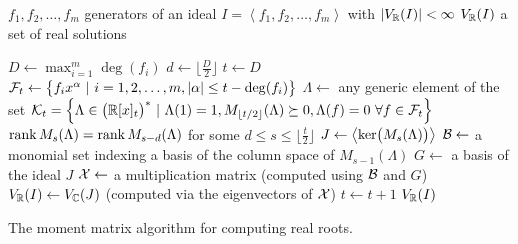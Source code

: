 \begin{algorithm}[ht]
  \begin{algorithmic}[1]
    \Require
      \Statex $f_1, f_2, \ldots, f_m$ generators of an ideal $I = \left<f_1, f_2, \ldots, f_m\right>$ with $|V_{\mathbb{R}}(I)|<\infty$
    \Ensure
      \Statex $V_{\mathbb{R}}(I)$ a set of real solutions
      \Statex

    \State $D \gets \max_{i=1}^m\deg(f_i)$
    \State $d \gets \big\lfloor \frac{D}{2} \big\rfloor$
    \State $t \gets D$
    \While{\True}
    \State $\mathcal{F}_t \gets \big\{f_ix^\alpha\ |\ i = 1, 2, \ldots, m, |\alpha|\leq t-\deg(f_i)\big\}$
    \State $\Lambda \gets$ any generic element of the set $\mathcal{K}_t = \Big\{\Lambda\in\big(\mathbb{R}[x]_{t}\big)^*\ |\ \Lambda(1) = 1, M_{\lfloor t/2\rfloor}(\Lambda) \succeq 0, \Lambda(f) = 0 \ \forall f\in\mathcal{F}_t\Big\}$
      \StatexIndent[1]$\operatorname{rank}M_s(\Lambda)=\operatorname{rank} M_{s-d}(\Lambda)$ for some $d \leq s \leq \big\lfloor\frac{t}{2}\big\rfloor$ \algorithmicthen
      \State $J \gets \left<\operatorname{ker}\!\big(M_s(\Lambda)\big)\right>$
      \State $\mathcal{B} \gets$ a monomial set indexing a basis of the column space of $M_{s-1}(\Lambda)$
      \State $G \gets$ a basis of the ideal $J$
      \State $\mathcal{X} \gets$ a multiplication matrix (computed using $\mathcal{B}$ and $G$)
      \State $V_{\mathbb{R}}(I) \gets V_{\mathbb{C}}(J)$ (computed via the eigenvectors of $\mathcal{X}$)
      \State \Break
    \Else
      \State $t \gets t + 1$
    \EndIf
    \EndWhile
    \State \Return $V_{\mathbb{R}}(I)$

  \end{algorithmic}
  \caption{The moment matrix algorithm for computing real roots.}
\end{algorithm}
